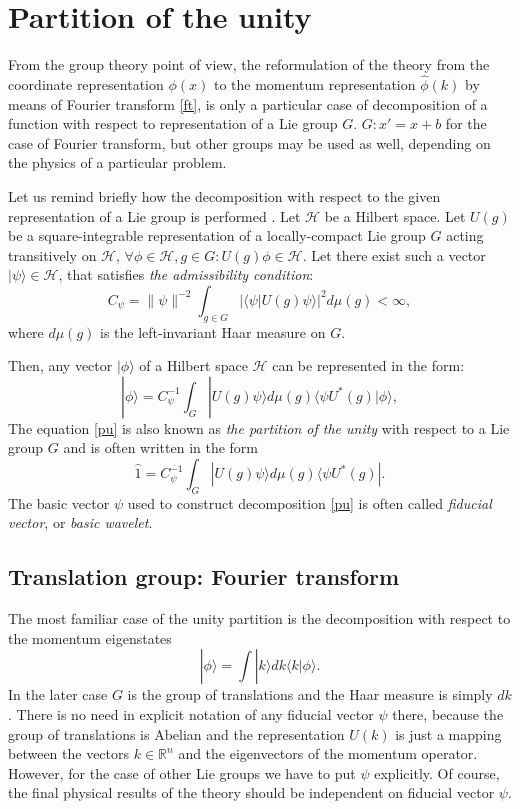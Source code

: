 \documentclass[a4paper,a4paper]{article}
\def\bra{\langle}
\def\ket{\rangle}
\newcommand{\R}{\mathbb{R}}
\def\cH{{\mathcal H}}             %
\def\bra{\langle}
\def\ket{\rangle}
\begin{document}
\section{Partition of the unity} 
From the group theory 
point of view, 
the reformulation of the theory from the coordinate representation 
$\phi(x)$ to the momentum representation $\hat\phi(k)$ by means  of 
Fourier transform \eqref{ft}, is only a particular case of decomposition 
of a function with respect to representation of a Lie group $G$. 
$G: x'=x+b$ for the case of Fourier transform, but other groups 
may be used as well, depending on the physics of a particular problem.

Let us remind briefly how the decomposition with respect to the given  
representation of a Lie group is performed \cite{Carey76,DM1976}. 
Let $\cH$ be a Hilbert space. Let $U(g)$ be a square-integrable 
representation of a locally-compact Lie group $G$ acting transitively 
on $\cH$, $\forall \phi\in\cH,g\in G : U(g)\phi \in \cH$. Let there 
exist such a vector  $|\psi\ket \in \cH$, that satisfies  
{\em the admissibility condition}: 
\begin{equation}
C_\psi = \|\psi \|^{-2} \int_{g\in G} |\bra\psi|U(g)\psi \ket|^2 d\mu(g) < \infty
,
\label{adc}
\end{equation}
where $d\mu(g)$ is the left-invariant Haar measure on $G$.

Then, any vector $|\phi\ket$ of a Hilbert space $\cH$ can be 
represented in the form:
\begin{equation}
|\phi\ket = C_\psi^{-1} \int_G |U(g)\psi\ket d\mu(g)\bra\psi U^*(g)|\phi\ket,
\label{pu}
\end{equation}
The equation \eqref{pu} is also known as {\em the partition of the unity} 
with respect to a Lie group $G$ and is often written in the form 
$$ \hat 1 = C_\psi^{-1} \int_G |U(g)\psi\ket d\mu(g)\bra\psi U^*(g)|.$$
The basic vector $\psi$ used to construct decomposition \eqref{pu} is 
often called {\em fiducial vector}, or {\em basic wavelet}. 

\subsection{Translation group: Fourier transform}
The most familiar case of the unity partition is the decomposition with 
respect to the momentum eigenstates 
\begin{equation}
|\phi\ket = \int |k\ket dk \bra k |\phi\ket.
\label{puk}
\end{equation} 
In the later case $G$ is the group of translations and 
the Haar measure is simply $dk$. There is no need in explicit notation 
of any fiducial vector $\psi$ there, because the group of translations 
is Abelian and the representation $U(k)$ is just a mapping between the 
vectors $k\in\R^n$ and the eigenvectors of the momentum operator. However, 
for the case of other Lie groups we have to put $\psi$ explicitly. 
Of course, the final physical results of the theory should be independent 
on fiducial vector $\psi$.
\end{document}
